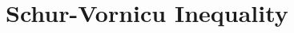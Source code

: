 \documentclass{subfile}
\begin{document}
	\chapter{Schur-Vornicu Inequality}\label{ch:sv}
\end{document}
